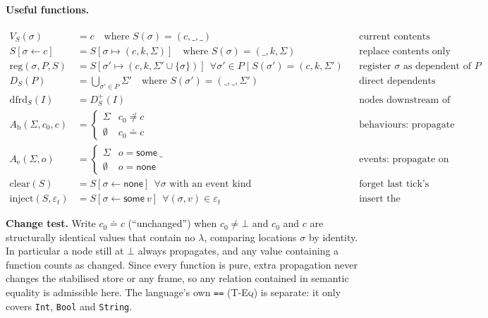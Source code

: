 \documentclass{article}
\newcommand{\kw}[1]{\mathsf{#1}}
\newcommand{\none}{\kw{none}}
\newcommand{\some}[1]{\kw{some}\ #1}
\newcommand{\dfrd}{\mathrm{dfrd}}
\begin{document}
\paragraph{Useful functions.}
\begin{align*}
V_S(\sigma) &= c \quad\text{where } S(\sigma) = (c,\_,\_) && \text{current contents}\\
S[\sigma \leftarrow c] &= S[\sigma \mapsto (c,k,\Sigma)] \quad\text{where } S(\sigma) = (\_,k,\Sigma) && \text{replace contents only}\\
\mathrm{reg}(\sigma,P,S) &= S[\sigma' \mapsto (c,k,\Sigma' \cup \{\sigma\})]\ \ \forall \sigma' \in P \mid S(\sigma') = (c,k,\Sigma') && \text{register $\sigma$ as dependent of $P$}\\
D_S(P) &= \textstyle\bigcup_{\sigma' \in P} \Sigma' \quad\text{where } S(\sigma') = (\_,\_,\Sigma') && \text{direct dependents}\\
\dfrd_S(I) &= D_S^{+}(I) && \text{nodes downstream of a dirty node}\\
  A_{\mathrm{b}}(\Sigma,c_0,c) &= \begin{cases}\Sigma & c_0 \not\doteq c\\ \emptyset & c_0 \doteq c\end{cases} && \text{behaviours: propagate on change}\\
A_{\mathrm{e}}(\Sigma,o) &= \begin{cases}\Sigma & o = \some{\_}\\ \emptyset & o = \none\end{cases} && \text{events: propagate on presence}\\
\mathrm{clear}(S) &= S[\sigma \leftarrow \none]\ \ \forall \sigma \text{ with an event kind} && \text{forget last tick's occurrences}\\
\mathrm{inject}(S,\varepsilon_t) &= S[\sigma \leftarrow \some{v}]\ \ \forall (\sigma,v) \in \varepsilon_t && \text{insert the environment's occurrences}
\end{align*}

\medskip
\noindent\textbf{Change test.} Write $c_0 \doteq c$ (``unchanged'') when $c_0 \neq \bot$ and $c_0$ and $c$ are structurally identical values that contain no $\lambda$, comparing locations $\sigma$ by identity. In particular a node still at $\bot$ always propagates, and any value containing a function counts as changed. Since every function is pure, extra propagation never changes the stabilised store or any frame, so any relation contained in semantic equality is admissible here. The language's own \texttt{==} (\textsc{T-Eq}) is separate: it only covers \texttt{Int}, \texttt{Bool} and \texttt{String}.
\end{document}
